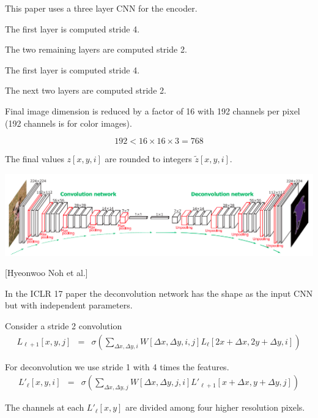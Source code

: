 {

This paper uses a three layer CNN for the encoder.

\vfill
The first layer is computed stride 4.

\vfill
The two remaining layers are computed stride 2.


\vfill
The first layer is computed stride 4.

\vfill
The next two layers are computed stride 2.

\vfill
Final image dimension is reduced by a factor of 16 with 192 channels per pixel (192 channels is for color images).

\vfill
$$192 < 16 \times 16 \times 3 = 768$$

\vfill
The final values $z[x,y,i]$ are rounded to integers $\tilde{z}[x,y,i]$.


\centerline{\includegraphics[width=9in]{../images/Deconv}}
\centerline{[Hyeonwoo Noh et al.]}

\vfill
In the ICLR 17 paper the deconvolution network has the shape as the input CNN but with independent parameters.


Consider a stride 2 convolution
\begin{eqnarray*}
  L_{\ell+1}[x,y,j] & = & \sigma\left(\sum_{\Delta x,\Delta y,i}   W[\Delta x, \Delta y, i,j] L_\ell[2x + \Delta x, 2y + \Delta y, i]\right)
\end{eqnarray*}

\vfill
For deconvolution we use stride 1 with 4 times the features.
\begin{eqnarray*}
  L'_\ell[x,y,i] & = & \sigma\left(\sum_{\Delta x,\Delta y,j}   W[\Delta x, \Delta y, j,i] L'_{\ell+1}[x + \Delta x, y + \Delta y, j]\right)
\end{eqnarray*}

\vfill
The channels at each $L'_\ell[x,y]$ are divided among four higher resolution pixels.

}
